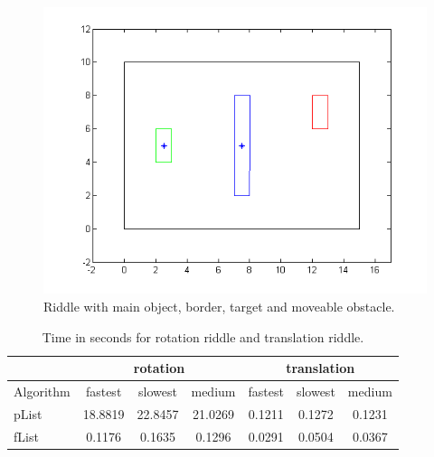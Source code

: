 \begin{figure}[H]
\includegraphics[scale = 0.5]{rotRiddle.png}
\centering
\caption{Riddle with main object, border, target and moveable obstacle.}
\end{figure}
\begin{table}
\centering
\begin{tabular}{l||c|c|c||c|c|c}
& \multicolumn{3}{c||}{rotation} &\multicolumn{3}{c}{translation}\\\hline\hline
Algorithm& fastest & slowest & medium & fastest & slowest & medium\\\hline
pList &  18.8819 & 22.8457  & 21.0269 &  0.1211& 0.1272  & 0.1231\\
fList  & 0.1176&0.1635  &0.1296  & 0.0291 & 0.0504 & 0.0367 \\
\end{tabular}
\caption{Time in seconds for rotation riddle and translation riddle.}
\end{table}

